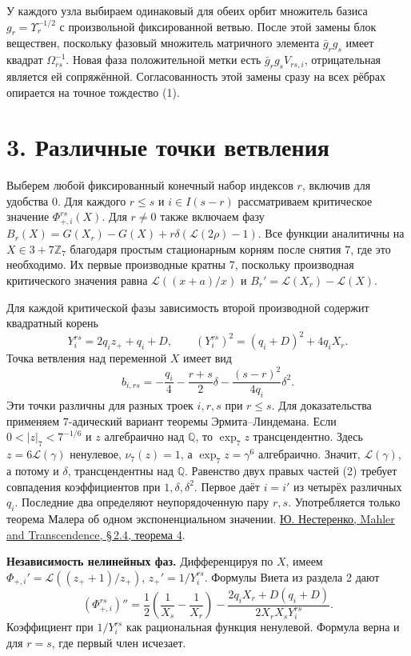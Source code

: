 \documentclass[11pt,a4paper]{article}
\newcommand{\sect}[1]{\section*{\sffamily\color{ink}#1}}
\newcommand{\subt}[1]{\par\medskip\noindent\textbf{#1.}\quad}
\newcommand{\Zp}{\mathbb Z_7}
\newcommand{\Q}{\mathbb Q}
\begin{document}
У каждого узла выбираем одинаковый для обеих орбит множитель базиса \(g_r=\Upsilon_r^{-1/2}\) с произвольной фиксированной ветвью. После этой замены блок веществен, поскольку фазовый множитель матричного элемента \(\bar g_r g_s\) имеет квадрат \(\Omega_{rs}^{-1}\). Новая фаза положительной метки есть \(\bar g_r g_s V_{rs,i}\), отрицательная является ей сопряжённой. Согласованность этой замены сразу на всех рёбрах опирается на точное тождество (1).
\newpage
\sect{3. Различные точки ветвления}
Выберем любой фиксированный конечный набор индексов \(r\), включив для удобства \(0\). Для каждого \(r\le s\) и \(i\in I(s-r)\) рассматриваем критическое значение \(\Phi_{+,i}^{rs}(X)\). Для \(r\ne0\) также включаем фазу \(B_r(X)=G(X_r)-G(X)+r\delta(\mathcal L(2\rho)-1)\). Все функции аналитичны на \(X\in3+7\Zp\) благодаря простым стационарным корням после снятия \(7\), где это необходимо. Их первые производные кратны \(7\), поскольку производная критического значения равна \(\mathcal L((x+a)/x)\) и \(B_r'=\mathcal L(X_r)-\mathcal L(X)\).

Для каждой критической фазы зависимость второй производной содержит квадратный корень
\[
 Y_i^{rs}=2q_i z_++q_i+D,\qquad
 (Y_i^{rs})^2=(q_i+D)^2+4q_i X_r.
\]
Точка ветвления над переменной \(X\) имеет вид
\begin{equation}
 b_{i,rs}=-\frac{q_i}{4}-\frac{r+s}{2}\delta
                               -\frac{(s-r)^2}{4q_i}\delta^2.
                                                               \tag{2}
\end{equation}
Эти точки различны для разных троек \(i,r,s\) при \(r\le s\). Для доказательства применяем \(7\)-адический вариант теоремы Эрмита--Линдемана. Если \(0<|z|_7<7^{-1/6}\) и \(z\) алгебраично над \(\Q\), то \(\exp_7 z\) трансцендентно. Здесь \(z=6\mathcal L(\gamma)\) ненулевое, \(\nu_7(z)=1\), а \(\exp_7 z=\gamma^6\) алгебраично. Значит, \(\mathcal L(\gamma)\), а потому и \(\delta\), трансцендентны над \(\Q\). Равенство двух правых частей (2) требует совпадения коэффициентов при \(1,\delta,\delta^2\). Первое даёт \(i=i'\) из четырёх различных \(q_i\). Последние два определяют неупорядоченную пару \(r,s\). Употребляется только теорема Малера об одном экспоненциальном значении. \href{https://ems.press/content/book-chapter-files/27396?nt=1}{Ю. Нестеренко, Mahler and Transcendence, §\,2.4, теорема 4}.

\subt{Независимость нелинейных фаз}
Дифференцируя по \(X\), имеем \(\Phi_{+,i}'=\mathcal L((z_++1)/z_+)\), \(z_+'=1/Y_i^{rs}\). Формулы Виета из раздела 2 дают
\begin{equation}
 (\Phi_{+,i}^{rs})''
 =\frac12\left(\frac1{X_s}-\frac1{X_r}\right)
   -\frac{2q_i X_r+D(q_i+D)}{2X_rX_s Y_i^{rs}}.
                                                               \tag{3}
\end{equation}
Коэффициент при \(1/Y_i^{rs}\) как рациональная функция ненулевой. Формула верна и для \(r=s\), где первый член исчезает.
\end{document}
